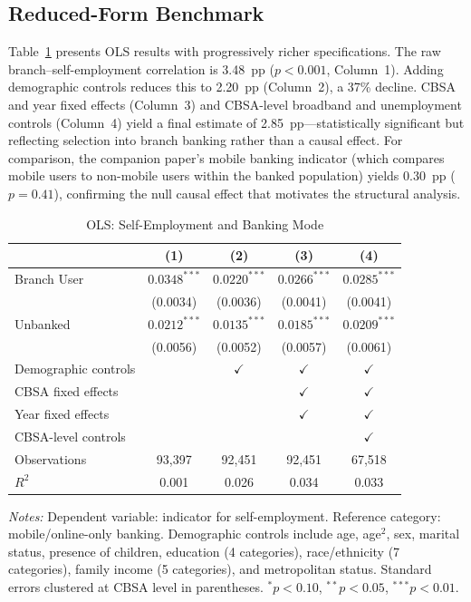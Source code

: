 \documentclass[12pt]{article}
\begin{document}
\subsection{Reduced-Form Benchmark}
\label{subsec:reducedform}

Table~\ref{tab:baseline_ols} presents OLS results with progressively richer specifications. The raw branch--self-employment correlation is 3.48~pp ($p < 0.001$, Column~1). Adding demographic controls reduces this to 2.20~pp (Column~2), a 37\% decline. CBSA and year fixed effects (Column~3) and CBSA-level broadband and unemployment controls (Column~4) yield a final estimate of 2.85~pp---statistically significant but reflecting selection into branch banking rather than a causal effect. For comparison, the companion paper's mobile banking indicator (which compares mobile users to non-mobile users within the banked population) yields 0.30~pp ($p = 0.41$), confirming the null causal effect that motivates the structural analysis.

\begin{table}[H]
\centering
\caption{OLS: Self-Employment and Banking Mode}
\label{tab:baseline_ols}
\begin{threeparttable}
\begin{tabular}{lcccc}
\toprule
& (1) & (2) & (3) & (4) \\
\midrule
Branch User & $0.0348^{***}$ & $0.0220^{***}$ & $0.0266^{***}$ & $0.0285^{***}$ \\
& (0.0034) & (0.0036) & (0.0041) & (0.0041) \\
[4pt]
Unbanked & $0.0212^{***}$ & $0.0135^{***}$ & $0.0185^{***}$ & $0.0209^{***}$ \\
& (0.0056) & (0.0052) & (0.0057) & (0.0061) \\
\midrule
Demographic controls & & $\checkmark$ & $\checkmark$ & $\checkmark$ \\
CBSA fixed effects & & & $\checkmark$ & $\checkmark$ \\
Year fixed effects & & & $\checkmark$ & $\checkmark$ \\
CBSA-level controls & & & & $\checkmark$ \\
\midrule
Observations & 93,397 & 92,451 & 92,451 & 67,518 \\
$R^2$ & 0.001 & 0.026 & 0.034 & 0.033 \\
\bottomrule
\end{tabular}
\begin{tablenotes}
\small
\item \textit{Notes:} Dependent variable: indicator for self-employment. Reference category: mobile/online-only banking. Demographic controls include age, age$^2$, sex, marital status, presence of children, education (4 categories), race/ethnicity (7 categories), family income (5 categories), and metropolitan status. Standard errors clustered at CBSA level in parentheses. $^{*}p<0.10$, $^{**}p<0.05$, $^{***}p<0.01$.
\end{tablenotes}
\end{threeparttable}
\end{table}
\end{document}
